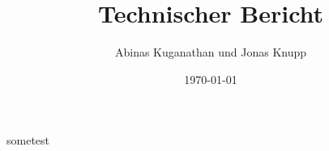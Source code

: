 \documentclass{report}
\title{Technischer Bericht}
\author{Abinas Kuganathan und Jonas Knupp}
\date{\today}
\begin{document}
\maketitle
\tableofcontents
sometest






\end{document}
